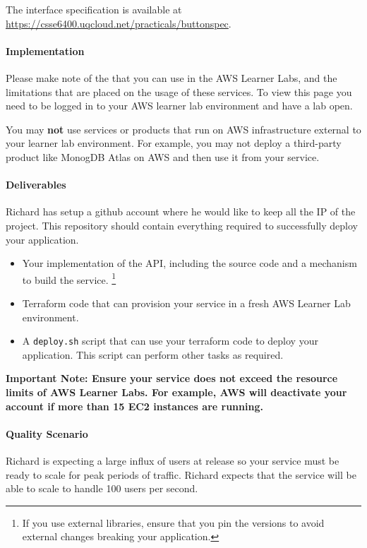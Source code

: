 \documentclass{csse4400}
\begin{document}
The interface specification is available at \url{https://csse6400.uqcloud.net/practicals/buttonspec}.

\paragraph{Implementation}
Please make note of the  that you can use in the AWS Learner Labs, and the limitations that are placed on the usage of these services. To view this page you need to be logged in to your AWS learner lab environment and have a lab open.

You may \textbf{not} use services or products that run on AWS infrastructure external to your learner lab environment. For example, you may not deploy a third-party product like MonogDB Atlas on AWS and then use it from your service.

\paragraph{Deliverables}
Richard has setup a github account where he would like to keep all the IP of the project. This repository should contain everything required to successfully deploy your application.

\begin{itemize}
  \item Your implementation of the API, including the source code and a mechanism to build the service.
  \footnote{If you use external libraries, ensure that you pin the versions to avoid external changes breaking your application.}
  \item Terraform code that can provision your service in a fresh AWS Learner Lab environment.
  \item A \texttt{deploy.sh} script that can use your terraform code to deploy your application. This script can perform other tasks as required.
\end{itemize}

\textbf{Important Note: 
Ensure your service does not exceed the resource limits of AWS Learner Labs.
For example, AWS will deactivate your account if more than 15 EC2 instances are running.}

\paragraph{Quality Scenario}

Richard is expecting a large influx of users at release so your service must be ready to scale for peak periods of traffic. Richard expects that the service will be able to scale to handle 100 users per second.





\end{document}
